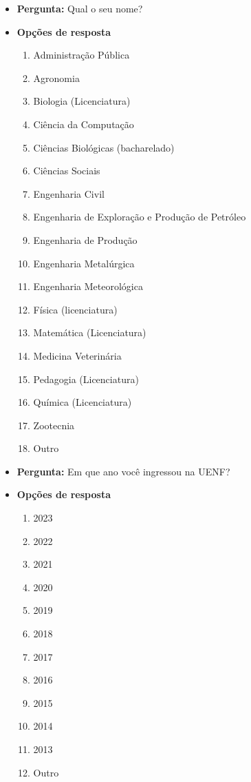 \begin{apendicesenv}
        \begin{itemize}
            \item \textbf{Pergunta:} Qual o seu nome?
            \item \textbf{Opções de resposta}
            \begin{enumerate}
                \item Administração Pública
                \item Agronomia
                \item Biologia (Licenciatura)
                \item Ciência da Computação
                \item Ciências Biológicas (bacharelado)
                \item Ciências Sociais
                \item Engenharia Civil
                \item Engenharia de Exploração e Produção de Petróleo
                \item Engenharia de Produção
                \item Engenharia Metalúrgica
                \item Engenharia Meteorológica
                \item Física (licenciatura)
                \item Matemática (Licenciatura)
                \item Medicina Veterinária
                \item Pedagogia (Licenciatura)
                \item Química (Licenciatura)
                \item Zootecnia
                \item Outro
            \end{enumerate}
        \end{itemize}

        \begin{itemize}
            \item \textbf{Pergunta:} Em que ano você ingressou na UENF?
            \item \textbf{Opções de resposta}
            \begin{enumerate}
                \item 2023
                \item 2022
                \item 2021
                \item 2020
                \item 2019
                \item 2018
                \item 2017
                \item 2016
                \item 2015
                \item 2014
                \item 2013
                \item Outro
            \end{enumerate}
        \end{itemize}


\end{apendicesenv}
